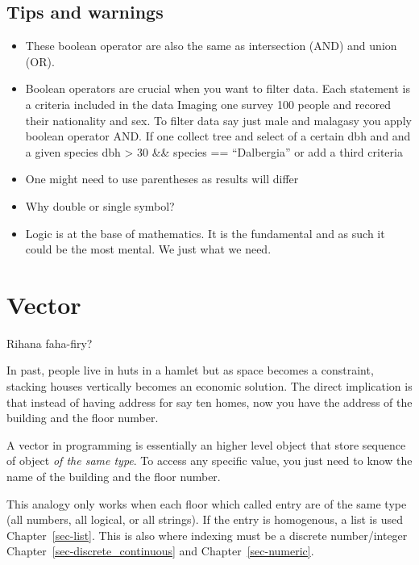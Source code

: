 \documentclass[
  letterpaper,
  DIV=11,
  numbers=noendperiod]{scrreprt}
\providecommand{\tightlist}{%
  \setlength{\itemsep}{0pt}\setlength{\parskip}{0pt}}
\begin{document}
\section*{Tips and warnings}\label{tips-and-warnings-26}


\begin{itemize}
\tightlist
\item
  These boolean operator are also the same as intersection (AND) and
  union (OR).
\item
  Boolean operators are crucial when you want to filter data. Each
  statement is a criteria included in the data Imaging one survey 100
  people and recored their nationality and sex. To filter data say just
  male and malagasy you apply boolean operator AND. If one collect tree
  and select of a certain dbh and and a given species dbh \textgreater{}
  30 \&\& species == ``Dalbergia'' or add a third criteria
\item
  One might need to use parentheses as results will differ
\item
  Why double or single symbol?
\item
  Logic is at the base of mathematics. It is the fundamental and as such
  it could be the most mental. We just what we need.
\end{itemize}

\chapter{Vector}\label{sec-vector}

Rihana faha-firy?

In past, people live in huts in a hamlet but as space becomes a
constraint, stacking houses vertically becomes an economic solution. The
direct implication is that instead of having address for say ten homes,
now you have the address of the building and the floor number.

A vector in programming is essentially an higher level object that store
sequence of object \emph{of the same type}. To access any specific
value, you just need to know the name of the building and the floor
number.

This analogy only works when each floor which called entry are of the
same type (all numbers, all logical, or all strings). If the entry is
homogenous, a list is used Chapter~\ref{sec-list}. This is also where
indexing must be a discrete number/integer
Chapter~\ref{sec-discrete_continuous} and Chapter~\ref{sec-numeric}.
\end{document}
